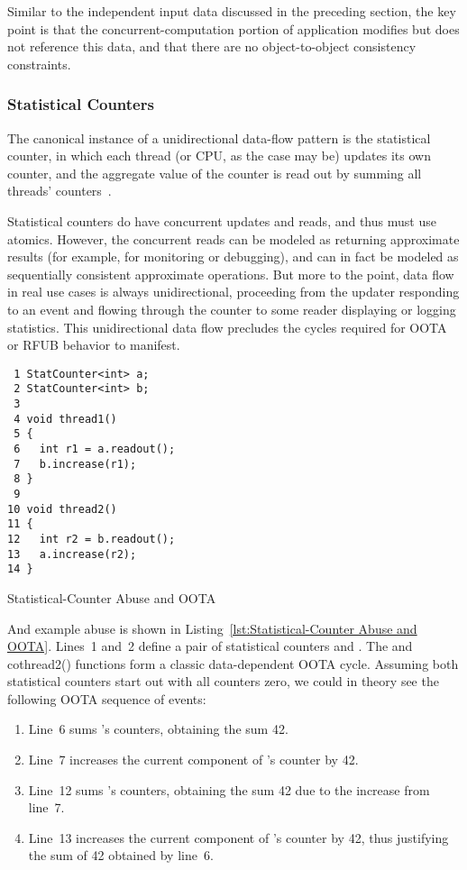 \documentclass[10]{article}
\begin{document}
Similar to the independent input data discussed in the preceding section,
the key point is that the concurrent-computation portion of application
modifies but does not reference this data, and that there are no
object-to-object consistency constraints.

\subsubsection{Statistical Counters}
\label{sec:Statistical Counters}

The canonical instance of a unidirectional data-flow pattern is the
statistical counter, in which each thread (or CPU, as the case may be)
updates its own counter, and the aggregate value of the counter is read
out by summing all threads'
counters~\cite[Section 5.2]{McKenney2018ParallelProgramming-2018-12-08a}.

Statistical counters do have concurrent updates and reads, and thus must
use atomics.
However, the concurrent reads can be modeled as returning approximate
results (for example, for monitoring or debugging), and can in fact be
modeled as sequentially consistent approximate operations.
But more to the point, data flow in real use cases is always
unidirectional, proceeding from the updater responding to an event
and flowing through the counter to some reader displaying or logging
statistics.
This unidirectional data flow precludes the cycles required for OOTA or
RFUB behavior to manifest.

\begin{listing}[tbp]
\begin{verbatim}
 1 StatCounter<int> a;
 2 StatCounter<int> b;
 3
 4 void thread1()
 5 {
 6   int r1 = a.readout();
 7   b.increase(r1);
 8 }
 9
10 void thread2()
11 {
12   int r2 = b.readout();
13   a.increase(r2);
14 }
\end{verbatim}
\caption{Statistical-Counter Abuse and OOTA}
\label{lst:Statistical-Counter Abuse and OOTA}
\end{listing}

And example abuse is shown in
Listing~\ref{lst:Statistical-Counter Abuse and OOTA}.
Lines~1 and~2 define a pair of statistical counters  and .
The  and co{thread2()} functions form a classic
data-dependent OOTA cycle.
Assuming both statistical counters start out with all counters zero,
we could in theory see the following OOTA sequence of events:

\begin{enumerate}
\item	Line~6 sums 's counters, obtaining the sum 42.
\item	Line~7 increases the current component of 's counter by 42.
\item	Line~12 sums 's counters, obtaining the sum 42 due to the
	increase from line~7.
\item	Line~13 increases the current component of 's counter by 42,
	thus justifying the sum of 42 obtained by line~6.
\end{enumerate}
\end{document}
